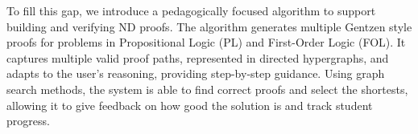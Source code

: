 
To fill this gap, we introduce a pedagogically focused algorithm to support building and verifying ND proofs. The algorithm generates multiple Gentzen style proofs for problems in Propositional Logic (PL) and First-Order Logic (FOL). It captures multiple valid proof paths, represented in directed hypergraphs, and adapts to the user’s reasoning, providing step-by-step guidance. Using graph search methods, the system is able to find correct proofs and select the  shortests, allowing it to give feedback on how good the solution is and track student progress.
